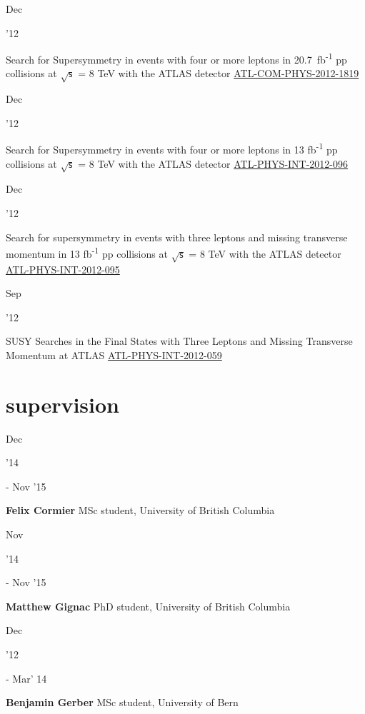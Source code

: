 \documentclass[]{cv} %
\begin{document}
\begin{entrylist}
\entry
{\parbox[t]{\parboxWidthOne}{Dec}\parbox[t]{\parboxWidthTwo}{\hfill '12}}
{Search for Supersymmetry in events with four or more leptons in 20.7~fb\textsuperscript{-1} pp collisions at $\sqrt{\mathsf{s}}$
= 8 TeV with the ATLAS detector}
{\href{https://cds.cern.ch/record/1501709}{ATL-COM-PHYS-2012-1819}}
{\vspace*{\spacingPubs}}

\entry
{\parbox[t]{\parboxWidthOne}{Dec}\parbox[t]{\parboxWidthTwo}{\hfill '12}}
{Search for Supersymmetry in events with four or more leptons in 13 fb\textsuperscript{-1} pp collisions at $\sqrt{\mathsf{s}}$ =
8 TeV with the ATLAS detector}
{\href{https://cds.cern.ch/record/1498627}{ATL-PHYS-INT-2012-096}}
{\vspace*{\spacingPubs}}

\entry
{\parbox[t]{\parboxWidthOne}{Dec}\parbox[t]{\parboxWidthTwo}{\hfill '12}}
{Search for supersymmetry in events with three leptons and missing transverse momentum in 13 fb\textsuperscript{-1} pp collisions
at $\sqrt{\mathsf{s}}$ = 8 TeV with the ATLAS detector}
{\href{https://cds.cern.ch/record/1498390}{ATL-PHYS-INT-2012-095}}
{\vspace*{\spacingPubs}}

\entry
{\parbox[t]{\parboxWidthOne}{Sep}\parbox[t]{\parboxWidthTwo}{\hfill '12}}
{SUSY Searches in the Final States with Three Leptons and Missing Transverse Momentum at ATLAS}
{\href{https://cds.cern.ch/record/1482141}{ATL-PHYS-INT-2012-059}}
{\vspace*{\spacingPubs}}

\end{entrylist}
\fi

\section{supervision}

\begin{entrylist}

  \entry
  {\parbox[t]{\parboxWidthOne}{Dec}\parbox[t]{\parboxWidthTwo}{\hfill '14} -
Nov '15}
{\textbf{Felix Cormier}}
  {}
  {MSc student, University of British Columbia}

  \entry
  {\parbox[t]{\parboxWidthOne}{Nov}\parbox[t]{\parboxWidthTwo}{\hfill '14} -
Nov '15}
{\textbf{Matthew Gignac}}
  {}
  {PhD student, University of British Columbia}

  \entry
  {\parbox[t]{\parboxWidthOne}{Dec}\parbox[t]{\parboxWidthTwo}{\hfill '12} -
Mar' 14}
{\textbf{Benjamin Gerber}}
  {}
  {MSc student, University of Bern}

\end{entrylist}
\end{document}
